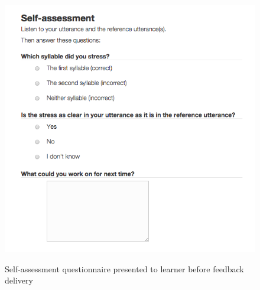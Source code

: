  	
 	\begin{figure}
		\centering
		\caption{Self-assessment questionnaire presented to learner before feedback delivery}
		\includegraphics[width=.7\textwidth]{img/screenshots/selfAssessment}
		\label{fig:selfassess}
	\end{figure}
		
		
		
%	
%



















